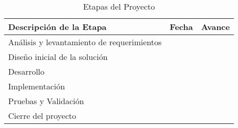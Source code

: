 \begin{table}[H]
	\centering
	\begin{tabular}{@{}lll@{}}
		\toprule
		\textbf{Descripción de la Etapa}           & \textbf{Fecha} & \textbf{Avance} \\ \midrule
		Análisis y levantamiento de requerimientos &                &                 \\
		Diseño inicial de la solución              &                &                 \\
		Desarrollo                                 &                &                 \\
		Implementación                             &                &                 \\
		Pruebas y Validación                       &                &                 \\
		Cierre del proyecto                        &                &                 \\ \bottomrule
	\end{tabular}
	\caption{Etapas del Proyecto}
	\label{tab:my-table}
\end{table}
